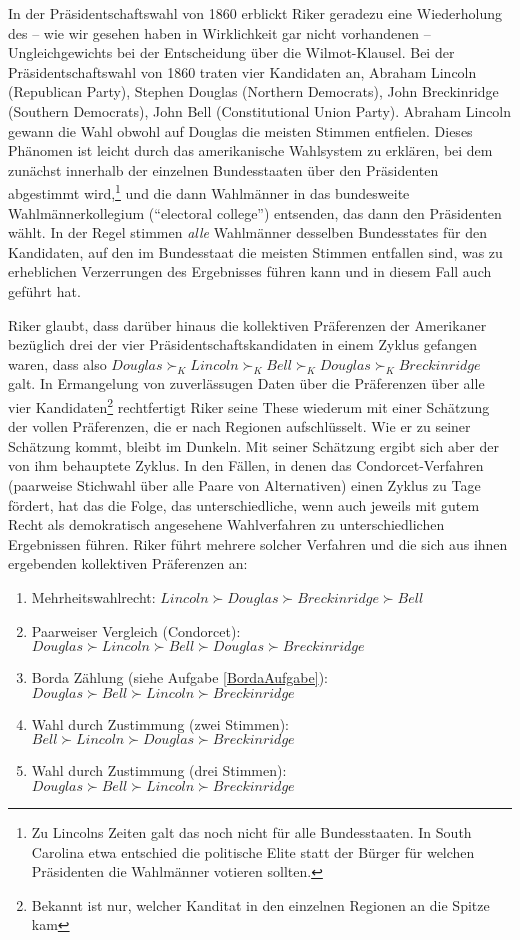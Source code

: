 In der Präsidentschaftswahl von 1860 erblickt Riker geradezu eine Wiederholung
des -- wie wir gesehen haben in Wirklichkeit gar nicht vorhandenen --
Ungleichgewichts bei der Entscheidung über die Wilmot-Klausel. Bei der
Präsidentschaftswahl von 1860 traten vier Kandidaten an, Abraham Lincoln
(Republican Party), Stephen Douglas (Northern Democrats), John Breckinridge
(Southern Democrats), John Bell (Constitutional Union Party). Abraham Lincoln
gewann die Wahl obwohl auf Douglas die meisten Stimmen entfielen. Dieses Phänomen
ist leicht durch das amerikanische Wahlsystem zu erklären, bei dem zunächst
innerhalb der einzelnen Bundesstaaten über den Präsidenten abgestimmt
wird,\footnote{Zu Lincolns Zeiten galt das noch nicht für alle Bundesstaaten. In
South Carolina etwa entschied die politische Elite statt der Bürger für welchen
Präsidenten die Wahlmänner votieren sollten.} und die dann Wahlmänner in das
bundesweite Wahlmännerkollegium (``electoral college'') entsenden, das dann den
Präsidenten wählt. In der Regel stimmen {\em alle} Wahlmänner desselben
Bundesstates für den Kandidaten, auf den im Bundesstaat die meisten Stimmen
entfallen sind, was zu erheblichen Verzerrungen des Ergebnisses führen kann und
in diesem Fall auch geführt hat.

Riker glaubt, dass darüber hinaus die kollektiven Präferenzen der Amerikaner
bezüglich drei der vier Präsidentschaftskandidaten in einem Zyklus gefangen
waren, dass also $Douglas \succ_K Lincoln \succ_K Bell \succ_K Douglas \succ_K
Breckinridge$ galt. In Ermangelung von zuverlässugen Daten über die Präferenzen
über alle vier Kandidaten\footnote{Bekannt ist nur, welcher Kanditat in den
einzelnen Regionen an die Spitze kam} rechtfertigt Riker seine These wiederum mit
einer Schätzung der vollen Präferenzen, die er nach Regionen
aufschlüsselt.\cite[S. 230/231]{riker:1982} Wie er zu seiner Schätzung kommt,
bleibt im Dunkeln. Mit seiner Schätzung ergibt sich aber der von ihm behauptete
Zyklus. In den Fällen, in denen das Condorcet-Verfahren (paarweise Stichwahl
über alle Paare von Alternativen) einen Zyklus zu Tage fördert, hat das die
Folge, das unterschiedliche, wenn auch jeweils mit gutem Recht als demokratisch
angesehene Wahlverfahren zu unterschiedlichen Ergebnissen führen. Riker führt
mehrere solcher Verfahren und die sich aus ihnen ergebenden kollektiven
Präferenzen an:

\begin{enumerate}
  \item Mehrheitswahlrecht: $Lincoln \succ Douglas \succ Breckinridge \succ
  Bell$
  \item Paarweiser Vergleich (Condorcet): $Douglas \succ Lincoln \succ Bell 
  \succ Douglas \succ Breckinridge$
  \item Borda Zählung (siehe Aufgabe \ref{BordaAufgabe}): $Douglas \succ Bell
  \succ Lincoln \succ Breckinridge$
  \item Wahl durch Zustimmung (zwei Stimmen): $Bell \succ Lincoln \succ Douglas
  \succ Breckinridge$
  \item Wahl durch Zustimmung (drei Stimmen): $Douglas \succ Bell \succ Lincoln
  \succ Breckinridge$
\end{enumerate}

